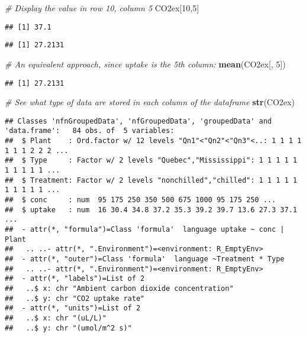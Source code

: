 \documentclass[]{article}
\newenvironment{Shaded}{\begin{snugshade}}{\end{snugshade}}
\newcommand{\CommentTok}[1]{\textcolor[rgb]{0.56,0.35,0.01}{\textit{#1}}}
\newcommand{\DecValTok}[1]{\textcolor[rgb]{0.00,0.00,0.81}{#1}}
\newcommand{\KeywordTok}[1]{\textcolor[rgb]{0.13,0.29,0.53}{\textbf{#1}}}
\newcommand{\NormalTok}[1]{#1}
\newcommand{\OperatorTok}[1]{\textcolor[rgb]{0.81,0.36,0.00}{\textbf{#1}}}
\begin{document}
\begin{Shaded}
\begin{Highlighting}[]
\CommentTok{# Display the value in row 10, column 5}
\NormalTok{CO2ex[}\DecValTok{10}\NormalTok{,}\DecValTok{5}\NormalTok{]}
\end{Highlighting}
\end{Shaded}

\begin{verbatim}
## [1] 37.1
\end{verbatim}

\begin{Shaded}
\end{Shaded}

\begin{verbatim}
## [1] 27.2131
\end{verbatim}

\begin{Shaded}
\begin{Highlighting}[]
\CommentTok{# An equivalent approach, since uptake is the 5th column:}
\KeywordTok{mean}\NormalTok{(CO2ex[, }\DecValTok{5}\NormalTok{])}
\end{Highlighting}
\end{Shaded}

\begin{verbatim}
## [1] 27.2131
\end{verbatim}

\begin{Shaded}
\begin{Highlighting}[]
\CommentTok{# See what type of data are stored in each column of the dataframe}
\KeywordTok{str}\NormalTok{(CO2ex)}
\end{Highlighting}
\end{Shaded}

\begin{verbatim}
## Classes 'nfnGroupedData', 'nfGroupedData', 'groupedData' and 'data.frame':   84 obs. of  5 variables:
##  $ Plant    : Ord.factor w/ 12 levels "Qn1"<"Qn2"<"Qn3"<..: 1 1 1 1 1 1 1 2 2 2 ...
##  $ Type     : Factor w/ 2 levels "Quebec","Mississippi": 1 1 1 1 1 1 1 1 1 1 ...
##  $ Treatment: Factor w/ 2 levels "nonchilled","chilled": 1 1 1 1 1 1 1 1 1 1 ...
##  $ conc     : num  95 175 250 350 500 675 1000 95 175 250 ...
##  $ uptake   : num  16 30.4 34.8 37.2 35.3 39.2 39.7 13.6 27.3 37.1 ...
##  - attr(*, "formula")=Class 'formula'  language uptake ~ conc | Plant
##   .. ..- attr(*, ".Environment")=<environment: R_EmptyEnv> 
##  - attr(*, "outer")=Class 'formula'  language ~Treatment * Type
##   .. ..- attr(*, ".Environment")=<environment: R_EmptyEnv> 
##  - attr(*, "labels")=List of 2
##   ..$ x: chr "Ambient carbon dioxide concentration"
##   ..$ y: chr "CO2 uptake rate"
##  - attr(*, "units")=List of 2
##   ..$ x: chr "(uL/L)"
##   ..$ y: chr "(umol/m^2 s)"
\end{verbatim}
\end{document}
